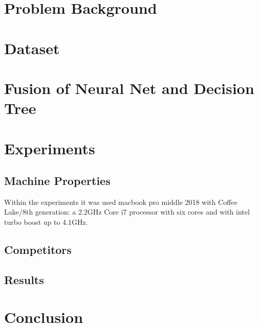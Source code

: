 \documentclass{article}
\begin{document}
\section{Problem Background}


\section{Dataset}

\section{Fusion of Neural Net and Decision Tree}

\section{Experiments}

\subsection{Machine Properties}
Within the experiments it was used macbook pro middle 2018 with Coffee Lake/8th generation: a 2.2GHz Core i7 processor with six cores and with intel turbo boost up to 4.1GHz.

\subsection{Competitors}
\subsection{Results}

\section{Conclusion}



\printbibliography
\end{document}
